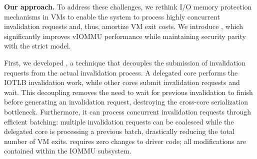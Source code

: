 

\textbf{Our approach.}
To address these challenges, we rethink I/O memory protection mechanisms in VMs
to enable the system to process highly concurrent invalidation requests and, thus, amortize VM exit costs.
We introduce \brand, which significantly improves vIOMMU performance
while maintaining security parity with the strict model.

First, we developed \emph{\optOne}, a technique that decouples
the submission of invalidation requests from the actual invalidation process.
A delegated core performs the IOTLB invalidation work,
while other cores submit invalidation requests and wait.
This decoupling removes the need to wait for previous invalidation to finish before generating an invalidation request,
destroying the cross-core serialization bottleneck.
Furthermore, it can process concurrent invalidation requests through efficient batching:
multiple invalidation requests can be coalesced
while the delegated core is processing a previous batch,
drastically reducing the total number of VM exits.
\emph{\optOne} requires zero changes to driver code;
all modifications are contained within the IOMMU subsystem.


